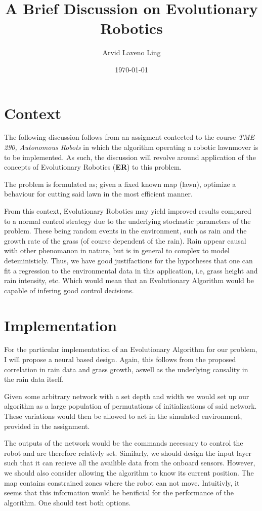 \documentclass{article}
\date{\today}
\author{Arvid Laveno Ling}
\title{A Brief Discussion on Evolutionary Robotics}
\begin{document}
\maketitle
\newpage

\section{Context}
The following discussion follows from an assigment contected to the course 
\textit{TME-290, Autonomous Robots} in which the algorithm operating a robotic
lawnmover is to be implemented. As such, the discussion will revolve around 
application of the concepts of Evolutionary Robotics (\textbf{ER}) to this 
problem.

The problem is formulated as; given a fixed known map (lawn), 
optimize a behaviour
for cutting said lawn in the most efficient manner. 

From this context, Evolutionary Robotics may yield improved results compared 
to a normal control strategy due to the underlying stochastic parameters of 
the problem. These being random events in the environment, such as rain 
and the growth rate of the grass (of course dependent of the rain). 
Rain appear causal with other phenomanon in nature, but is in general to
complex to model deteministicly. 
Thus, we have good justifactions for the hypotheses that one 
can fit a regression to the environmental data in this application, i.e, grass
height and rain intensity, etc. Which would mean that an Evolutionary Algorithm
would be capable of infering good control decisions.

\section{Implementation}
For the particular implementation of an Evolutionary Algorithm for our problem,
I will propose a neural based design. Again, this follows from the proposed
correlation in rain data and grass growth, aswell as the underlying causality 
in the rain data itself. 

Given some arbitrary network with a set depth and width we would set up our 
algorithm as a large population of permutations of initializations of said 
network. These variations would then be allowed to act in the simulated
environment, provided in the assignment.

The outputs of the network would be the commands necessary to control the robot
and are therefore relativly set. Similarly, we should design the input layer 
such that it can recieve all the availible data from the onboard sensors. 
However, we should also consider allowing the algorithm to know its current 
position. The map contains constrained zones where the robot can not move. 
Intuitivly, it seems that this information would be benificial for the 
performance of the algorithm. One should test both options.
\end{document}
